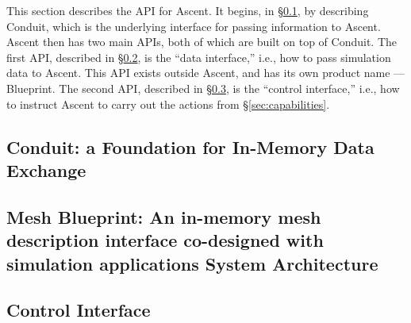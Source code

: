 This section describes the API for Ascent.
%
It begins, in \S\ref{Conduit}, by describing Conduit, which is the underlying
interface for passing information to Ascent.
%
Ascent then has two main APIs, both of which are built on top of Conduit.
%
%
The first API, described in \S\ref{Blueprint}, is the ``data interface,'' i.e., how
to pass simulation data to Ascent.
%
This API exists outside Ascent, and has its own product name --- Blueprint.
%
The second API, described in \S\ref{ascent_control}, is the ``control interface,''
i.e., how to instruct Ascent to carry out the actions from \S\ref{sec:capabilities}.

\subsection{Conduit: a Foundation for In-Memory Data Exchange}
\label{Conduit}


\subsection{Mesh Blueprint: An in-memory mesh description interface co-designed with simulation applications System Architecture}
\label{Blueprint}


\subsection{Control Interface}
\label{ascent_control}


